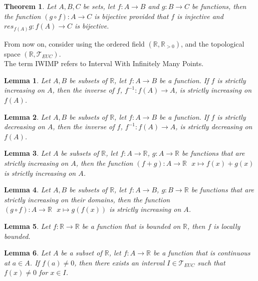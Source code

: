\documentclass[11pt]{article}
\theoremstyle{break}
\theoremstyle{break}
\newtheorem{thm}{Theorem}[section]
\newtheorem{lem}{Lemma}[thm]
\newcommand{\R}{\mathbb{R}}
\newcommand{\T}{\mathcal{T}}
\begin{document}
	\begin{thm}
		Let $A,B,C$ be sets, let $f:A \to B$ and $g:B \to C$ be functions, then the function $(g \circ f): A \to C$ is bijective provided that $f$ is injective and $res_{f(A)}g:f(A) \to C$ is bijective.
	\end{thm}
		

	\hfill\break
	\hfill\break
	\hfill\break
	\color{red} \noindent From now on, consider using the ordered field $(\R,\R_{>0})$, and the topological space $(\R,\T_{EUC})$.\\ The term IWIMP refers to Interval With Infinitely Many Points. \color{black}	
	
	\begin{lem}
		Let $A,B$ be subsets of $\R$, let $f:A \to B$ be a function. If $f$ is strictly increasing on $A$, then the inverse of $f$, $f^{-1}:f(A) \to A$, is strictly increasing on $f(A)$.
	\end{lem}
	
	\begin{lem}
		Let $A,B$ be subsets of $\R$, let $f:A \to B$ be a function. If $f$ is strictly decreasing on $A$, then the inverse of $f$, $f^{-1}:f(A) \to A$, is strictly decreasing on $f(A)$.
	\end{lem}
	
	\begin{lem}
		Let $A$ be subsets of $\R$, let $f:A \to \R$, $g:A \to \R$ be functions that are strictly increasing on $A$, then the function $(f+g):A \to \R \ \ \ x \mapsto f(x)+g(x)$ is strictly increasing on $A$.
	\end{lem}	
	
	\begin{lem}
		Let $A,B$ be subsets of $\R$, let $f:A \to B$, $g:B \to \R$ be functions that are strictly increasing on their domains, then the function $(g \circ f):A \to \R \ \ \ x \mapsto g(f(x))$ is strictly increasing on $A$.
	\end{lem}	
		
	\begin{lem}
		Let $f:\R \to \R$ be a function that is bounded on $\R$, then $f$ is locally bounded.
	\end{lem}
	
	\begin{lem}
		Let $A$ be a subset of $\R$, let $f:A \to \R$ be a function that is continuous at $a \in A$. If $f(a) \neq 0$, then there exists an interval $I \in \T_{EUC}$ such that $f(x) \neq 0$ for $x \in I$.
	\end{lem} 
	
\end{document}
